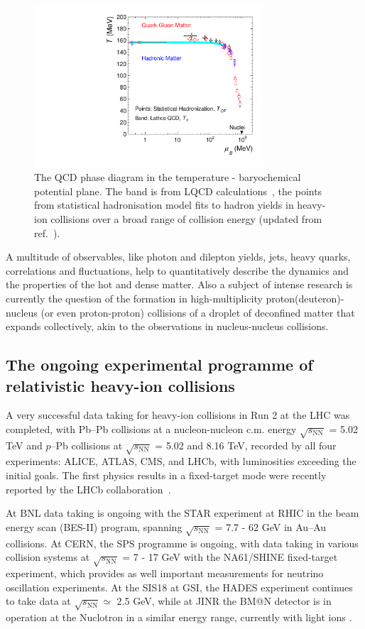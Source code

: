 \begin{figure}[!ht]
\center
\includegraphics[width=3.355in]{Strong-Interaction/T-mub_2019.pdf}
 \caption{The QCD phase diagram in the temperature - baryochemical potential plane. The band is from LQCD calculations~\cite{Bazavov:2018mes}, the points from statistical hadronisation model fits to hadron yields in heavy-ion collisions over a broad range of collision energy (updated from ref.~\cite{Andronic:2017pug}).}
\label{fig:Tmub}
\end{figure}

A multitude of observables, like photon and dilepton yields, jets, heavy quarks, correlations and fluctuations, help to quantitatively describe the dynamics and the properties of the hot and dense matter.
Also a subject of intense research is currently the question of the formation in high-multiplicity proton(deuteron)-nucleus (or even proton-proton) collisions of a droplet of deconfined matter that expands collectively, akin to the observations in nucleus-nucleus collisions.

\subsection{The ongoing experimental programme of relativistic heavy-ion collisions}

A very successful data taking for heavy-ion collisions in Run 2 at the LHC was completed, with Pb--Pb collisions at a nucleon-nucleon c.m. energy $\sqrt{s_{\mathrm{NN}}}$ = 5.02 TeV and $p$--Pb collisions at $\sqrt{s_{\mathrm{NN}}}$ = 5.02 and 8.16 TeV, recorded by all four experiments: ALICE,  ATLAS, CMS, and LHCb, with luminosities exceeding the initial goals.
The first physics results in a fixed-target mode were recently reported by the LHCb collaboration~\cite{Aaij:2018ogq,Aaij:2018svt}.

At BNL data taking is ongoing with the STAR experiment at RHIC in the beam energy scan (BES-II) program, spanning $\sqrt{s_{\mathrm{NN}}}$ = 7.7 - 62 GeV in Au--Au collisions. At CERN,  the SPS programme is ongoing, with data taking in various collision systems at $\sqrt{s_{\mathrm{NN}}}$ = 7 - 17 GeV with the NA61/SHINE fixed-target experiment, which provides as well important measurements for neutrino oscillation experiments.
At the SIS18 at GSI, the HADES experiment continues to take data at $\sqrt{s_{\mathrm{NN}}}\simeq$ 2.5 GeV, while at JINR the BM@N detector is in operation at the Nuclotron in a similar energy range, currently with light ions \cite{Galatyuk:2019lcf}.


